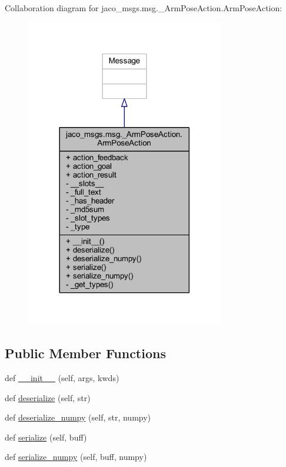Collaboration diagram for jaco\+\_\+msgs.\+msg.\+\_\+\+Arm\+Pose\+Action.\+Arm\+Pose\+Action\+:
\nopagebreak
\begin{figure}[H]
\begin{center}
\leavevmode
\includegraphics[width=245pt]{d4/d2e/classjaco__msgs_1_1msg_1_1__ArmPoseAction_1_1ArmPoseAction__coll__graph}
\end{center}
\end{figure}
\subsection*{Public Member Functions}
\begin{DoxyCompactItemize}
\item 
def \hyperlink{classjaco__msgs_1_1msg_1_1__ArmPoseAction_1_1ArmPoseAction_a6deb87aa69978cf47e5a8e8a0887a8fa}{\+\_\+\+\_\+init\+\_\+\+\_\+} (self, args, kwds)
\item 
def \hyperlink{classjaco__msgs_1_1msg_1_1__ArmPoseAction_1_1ArmPoseAction_a15aec4f7f7b31cd323152ca28eb8c0d6}{deserialize} (self, str)
\item 
def \hyperlink{classjaco__msgs_1_1msg_1_1__ArmPoseAction_1_1ArmPoseAction_aea2da209af900a77da7ec05d4594421e}{deserialize\+\_\+numpy} (self, str, numpy)
\item 
def \hyperlink{classjaco__msgs_1_1msg_1_1__ArmPoseAction_1_1ArmPoseAction_ab667d2d96dc44cf52c0c01d92d201efa}{serialize} (self, buff)
\item 
def \hyperlink{classjaco__msgs_1_1msg_1_1__ArmPoseAction_1_1ArmPoseAction_a91509d4135ea5cce376ed8e089cdbd1f}{serialize\+\_\+numpy} (self, buff, numpy)
\end{DoxyCompactItemize}
